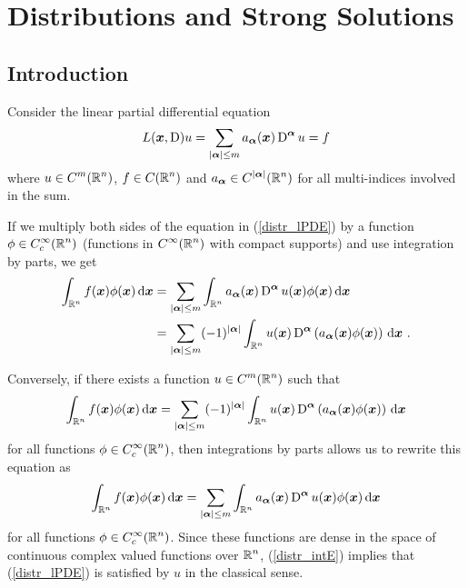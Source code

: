\chapter{Distributions and Strong Solutions}
\label{ChapterDistributions}

\section{Introduction}

Consider the linear partial differential equation
\begin{equation} \label{distr_lPDE}
L({\bm{x}}, \operatorname{D})u = \sum_{|{\bm{\alpha}}|\leq m}
a_{{\bm{\alpha}}}({\bm{x}}) \operatorname{D}^{{\bm{\alpha}}} u = f
\end{equation}
where $\displaystyle u \in C^m(\mathbb{R}^n)$, $\displaystyle f \in C(\mathbb{R}^n)$
and $\displaystyle a_{{\bm{\alpha}}} \in C^{|{\bm{\alpha}}|}(\mathbb{R}^n)$ for all
multi-indices involved in the sum.

If we multiply both sides of the equation in (\ref{distr_lPDE}) by a
function $\displaystyle \phi \in C_c^\infty(\mathbb{R}^n)$
(functions in $\displaystyle C^\infty(\mathbb{R}^n)$ with compact supports) and
use integration by parts, we get
\begin{align*}
\int_{\mathbb{R}^n} f({\bm{x}})\phi({\bm{x}}) \,\mathrm{d}{{\bm{x}}}
&= \sum_{|{\bm{\alpha}}|\leq m} \int_{\mathbb{R}^n} a_{{\bm{\alpha}}}({\bm{x}})
\operatorname{D}^{{\bm{\alpha}}} u({\bm{x}})\phi({\bm{x}}) \,\mathrm{d}{{\bm{x}}} \\
&= \sum_{|{\bm{\alpha}}|\leq m} (-1)^{|{\bm{\alpha}}|}\int_{\mathbb{R}^n}
u({\bm{x}}) \operatorname{D}^{{\bm{\alpha}}}
\left(a_{{\bm{\alpha}}}({\bm{x}})\phi({\bm{x}})\right) \,\mathrm{d}{{\bm{x}}} \ .
\end{align*}

Conversely, if there exists a function $\displaystyle u \in C^m(\mathbb{R}^n)$
such that
\begin{equation} \label{distr_intE}
\int_{\mathbb{R}^n} f({\bm{x}})\phi({\bm{x}}) \,\mathrm{d}{{\bm{x}}}
= \sum_{|{\bm{\alpha}}|\leq m} (-1)^{|{\bm{\alpha}}|}\int_{\mathbb{R}^n}
u({\bm{x}}) \operatorname{D}^{{\bm{\alpha}}}
\left(a_{{\bm{\alpha}}}({\bm{x}})\phi({\bm{x}})\right) \,\mathrm{d}{{\bm{x}}}
\end{equation}
for all functions $\displaystyle \phi \in C_c^\infty(\mathbb{R}^n)$,
then integrations by parts allows us to rewrite this equation as
\[
\int_{\mathbb{R}^n} f({\bm{x}})\phi({\bm{x}}) \,\mathrm{d}{{\bm{x}}}
= \sum_{|{\bm{\alpha}}|\leq m} \int_{\mathbb{R}^n} a_{{\bm{\alpha}}}({\bm{x}})
\operatorname{D}^{{\bm{\alpha}}} u({\bm{x}})\phi({\bm{x}}) \,\mathrm{d}{{\bm{x}}}
\]
for all functions $\displaystyle \phi \in C_c^\infty(\mathbb{R}^n)$.
Since these functions are dense in the space of continuous complex valued
functions over $\displaystyle \mathbb{R}^n$, (\ref{distr_intE}) implies that
(\ref{distr_lPDE}) is satisfied by $u$ in the classical sense.

